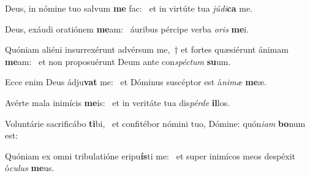 \item Deus, in nómine tuo salvum \textbf{me} fac:~\psstar{} et in virtúte tua \textit{júdi}\textbf{ca} me.
\item Deus, exáudi oratiónem \textbf{me}am:~\psstar{} áuribus pércipe verba \textit{oris} \textbf{me}i.
\item Quóniam aliéni insurrexérunt advérsum me,~† et fortes quæsiérunt ánimam \textbf{me}am:~\psstar{} et non proposuérunt Deum ante con\textit{spéctum} \textbf{su}um.
\item Ecce enim Deus ádju\textbf{vat} me:~\psstar{} et Dóminus suscéptor est á\textit{nimæ} \textbf{me}æ.
\item Avérte mala inimícis \textbf{me}is:~\psstar{} et in veritáte tua dis\textit{pérde} \textbf{il}los.
\item Voluntárie sacrificábo \textbf{ti}bi,~\psstar{} et confitébor nómini tuo, Dómine: quón\textit{iam} \textbf{bo}num est:
\item Quóniam ex omni tribulatióne eripu\textbf{ís}ti me:~\psstar{} et super inimícos meos despéxit ó\textit{culus} \textbf{me}us.
